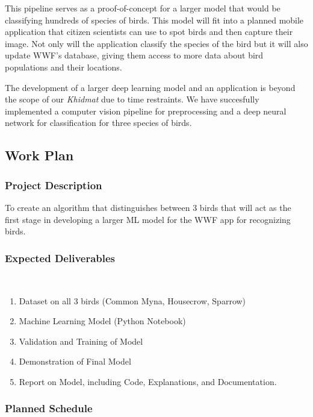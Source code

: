 \documentclass{article}
\begin{document}
This pipeline serves as a proof-of-concept for a larger model that 
would be classifying hundreds of species of birds. This model will fit 
into a planned mobile application that citizen scientists can use to spot birds 
and then capture their image. Not only will the application classify the 
species of the bird but it will also update WWF's database, giving them 
access to more data about bird populations and their locations. 

The development of a larger deep learning model and an application is 
beyond the scope of our \textit{Khidmat} due to time restraints. 
We have succesfully implemented a computer vision pipeline for preprocessing 
and a deep neural network for classification for three species of birds.

\subsection{Work Plan}
\subsubsection{Project Description}
To create an algorithm that distinguishes between 3 birds that will act as the first stage in developing a larger ML model for the WWF app for recognizing birds.
\subsubsection{Expected Deliverables}
\
\begin{enumerate}
    \item Dataset on all 3 birds (Common Myna, Housecrow, Sparrow) 
    \item Machine Learning Model (Python Notebook)
    \item Validation and Training of Model
    \item Demonstration of Final Model 
    \item Report on Model, including Code, Explanations, and Documentation.
\end{enumerate}

\subsubsection{Planned Schedule}
\end{document}

